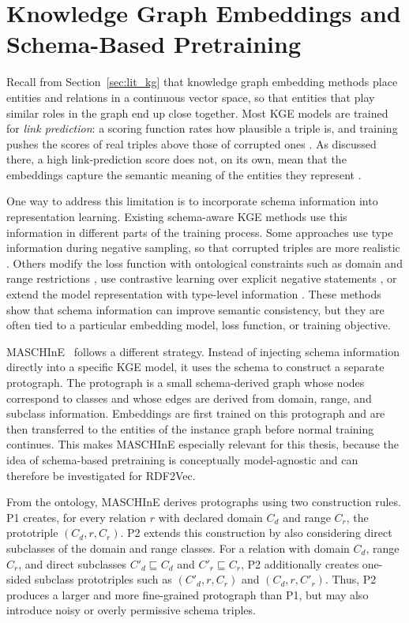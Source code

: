 \documentclass[a4paper,oneside,bibliography=totoc]{scrbook}
\begin{document}
\section{Knowledge Graph Embeddings and Schema-Based Pretraining}
\label{sec:lit_pretraining}

Recall from Section~\ref{sec:lit_kg} that knowledge graph embedding methods place
entities and relations in a continuous vector space, so that entities that play
similar roles in the graph end up close together. Most KGE models are trained for
\emph{link prediction}: a scoring function rates how plausible a triple is, and
training pushes the scores of real triples above those of corrupted ones
\citep{ji_survey_2022,sardina_survey_2024}. As discussed there, a high
link-prediction score does not, on its own, mean that the embeddings capture the
semantic meaning of the entities they represent \citep{jain2021semantics}.

One way to address this limitation is to incorporate schema information into
representation learning. Existing schema-aware KGE methods use this information
in different parts of the training process. Some approaches use type information during negative sampling, so that corrupted triples are more realistic
\citep{arenas_type-constrained_2015}. 
Others modify the loss function with ontological constraints such as domain and range restrictions
\citep{10.1007/978-3-030-77385-4_26,hubert_negatives_2024}, use contrastive learning over explicit negative statements
\citep{sousa_improving_2025},
or extend the model representation with type-level information
\citep{3060832.3061036}.
These methods show that schema information can improve semantic consistency,
but they are often tied to a particular embedding model, loss function, or
training objective.

MASCHInE~\citep{hubert2023maschine} follows a different strategy. Instead of
injecting schema information directly into a specific KGE model, it uses the
schema to construct a separate protograph. The protograph is a small
schema-derived graph whose nodes correspond to classes and whose edges are
derived from domain, range, and subclass information. Embeddings are first
trained on this protograph and are then transferred to the entities of the
instance graph before normal training continues. This makes MASCHInE especially
relevant for this thesis, because the idea of schema-based pretraining is
conceptually model-agnostic and can therefore be investigated for RDF2Vec.

From the ontology, MASCHInE derives protographs using two construction rules.
P1 creates, for every relation $r$ with declared domain $C_d$ and range $C_r$,
the prototriple $(C_d, r, C_r)$. P2 extends this construction by also
considering direct subclasses of the domain and range classes. For a relation
with domain $C_d$, range $C_r$, and direct subclasses
$C'_d \sqsubseteq C_d$ and $C'_r \sqsubseteq C_r$, P2 additionally creates
one-sided subclass prototriples such as $(C'_d, r, C_r)$ and
$(C_d, r, C'_r)$. Thus, P2 produces a larger and more fine-grained
protograph than P1, but may also introduce noisy or overly permissive schema
triples.
\end{document}
